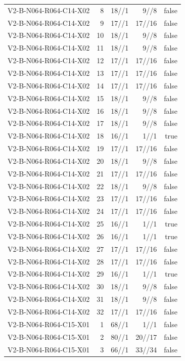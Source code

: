 {\begin{longtable}{lrrrr}
V2-B-N064-R064-C14-X02 & 8 & 18//1 & 9//8 & false \\
V2-B-N064-R064-C14-X02 & 9 & 17//1 & 17//16 & false \\
V2-B-N064-R064-C14-X02 & 10 & 18//1 & 9//8 & false \\
V2-B-N064-R064-C14-X02 & 11 & 18//1 & 9//8 & false \\
V2-B-N064-R064-C14-X02 & 12 & 17//1 & 17//16 & false \\
V2-B-N064-R064-C14-X02 & 13 & 17//1 & 17//16 & false \\
V2-B-N064-R064-C14-X02 & 14 & 17//1 & 17//16 & false \\
V2-B-N064-R064-C14-X02 & 15 & 18//1 & 9//8 & false \\
V2-B-N064-R064-C14-X02 & 16 & 18//1 & 9//8 & false \\
V2-B-N064-R064-C14-X02 & 17 & 18//1 & 9//8 & false \\
V2-B-N064-R064-C14-X02 & 18 & 16//1 & 1//1 & true \\
V2-B-N064-R064-C14-X02 & 19 & 17//1 & 17//16 & false \\
V2-B-N064-R064-C14-X02 & 20 & 18//1 & 9//8 & false \\
V2-B-N064-R064-C14-X02 & 21 & 17//1 & 17//16 & false \\
V2-B-N064-R064-C14-X02 & 22 & 18//1 & 9//8 & false \\
V2-B-N064-R064-C14-X02 & 23 & 17//1 & 17//16 & false \\
V2-B-N064-R064-C14-X02 & 24 & 17//1 & 17//16 & false \\
V2-B-N064-R064-C14-X02 & 25 & 16//1 & 1//1 & true \\
V2-B-N064-R064-C14-X02 & 26 & 16//1 & 1//1 & true \\
V2-B-N064-R064-C14-X02 & 27 & 17//1 & 17//16 & false \\
V2-B-N064-R064-C14-X02 & 28 & 17//1 & 17//16 & false \\
V2-B-N064-R064-C14-X02 & 29 & 16//1 & 1//1 & true \\
V2-B-N064-R064-C14-X02 & 30 & 18//1 & 9//8 & false \\
V2-B-N064-R064-C14-X02 & 31 & 18//1 & 9//8 & false \\
V2-B-N064-R064-C14-X02 & 32 & 17//1 & 17//16 & false \\
V2-B-N064-R064-C15-X01 & 1 & 68//1 & 1//1 & false \\
V2-B-N064-R064-C15-X01 & 2 & 80//1 & 20//17 & false \\
V2-B-N064-R064-C15-X01 & 3 & 66//1 & 33//34 & false \\

\end{longtable}}
